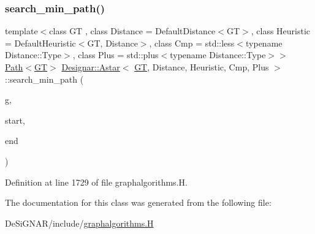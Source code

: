 \subsubsection{\texorpdfstring{search\+\_\+min\+\_\+path()}{search\_min\_path()}}
{\footnotesize\ttfamily template$<$class GT , class Distance  = Default\+Distance$<$\+G\+T$>$, class Heuristic  = Default\+Heuristic$<$\+G\+T, Distance$>$, class Cmp  = std\+::less$<$typename Distance\+::\+Type$>$, class Plus  = std\+::plus$<$typename Distance\+::\+Type$>$$>$ \\
\hyperlink{class_designar_1_1_path}{Path}$<$\hyperlink{demo-buildgraph_8_c_a3001c40d2c31ca87ed96cd7d1334a55e}{GT}$>$ \hyperlink{class_designar_1_1_astar}{Designar\+::\+Astar}$<$ \hyperlink{demo-buildgraph_8_c_a3001c40d2c31ca87ed96cd7d1334a55e}{GT}, Distance, Heuristic, Cmp, Plus $>$\+::search\+\_\+min\+\_\+path (\begin{DoxyParamCaption}\item[{\hyperlink{demo-buildgraph_8_c_a3001c40d2c31ca87ed96cd7d1334a55e}{GT} \&}]{g,  }\item[{\hyperlink{class_designar_1_1_astar_a0d4cdf6b94255824c6c93e5ae18e9eb7}{Node} \&}]{start,  }\item[{\hyperlink{class_designar_1_1_astar_a0d4cdf6b94255824c6c93e5ae18e9eb7}{Node} \&}]{end }\end{DoxyParamCaption})\hspace{0.3cm}{\ttfamily [inline]}}



Definition at line 1729 of file graphalgorithms.\+H.



The documentation for this class was generated from the following file\+:\begin{DoxyCompactItemize}
\item 
De\+Si\+G\+N\+A\+R/include/\hyperlink{graphalgorithms_8_h}{graphalgorithms.\+H}\end{DoxyCompactItemize}
